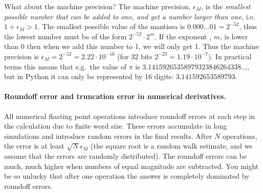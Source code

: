 \documentclass[graybox,sectrefs,envcountresetchap,open=right,final]{svmonodo}
\newenvironment{graybox2admon}[1][]{
\begin{graybox2mdframed}[frametitle=#1]
}
{
\end{graybox2mdframed}
}
\begin{document}
What about the machine precision? The machine precision, $\epsilon_M$, is the \emph{smallest possible number that can be added to one, and get a number larger than one}, i.e.~$1+\epsilon_M>1$.  The smallest possible value of the mantissa is $0.000\ldots 01=2^{-52}$, thus the lowest number must be of the form $2^{-52}\cdot 2^{m}$. If the exponent , $m$, is lower than 0 then when we add this number to 1, we will only get 1. Thus the machine precision is $\epsilon_M=2^{-52}=2.22\cdot10^{-16}$ (for 32 bits $2^{-23}=1.19\cdot10^{-7}$). In practical terms this means that e.g.~the value of $\pi$ is $3.14159265358979323846264338\ldots$, but in Python it can only be represented by 16 digits: $3.141592653589793$.

\paragraph{Roundoff error and truncation error in numerical derivatives.}


\begin{graybox2admon}[Roundoff Errors]
All numerical floating point operations introduce roundoff errors at each step in the calculation due to finite word size. These errors accumulate in long simulations and introduce random errors in the final results. After $N$ operations, the error is at least $\sqrt{N}\epsilon_M$ (the square root is a random walk estimate, and we assume that the errors are randomly distributed). The roundoff errors can be much, much higher when numbers of equal magnitude are subtracted. You might be so unlucky that after one operation the answer is completely dominated by roundoff errors.
\end{graybox2admon}
\end{document}
